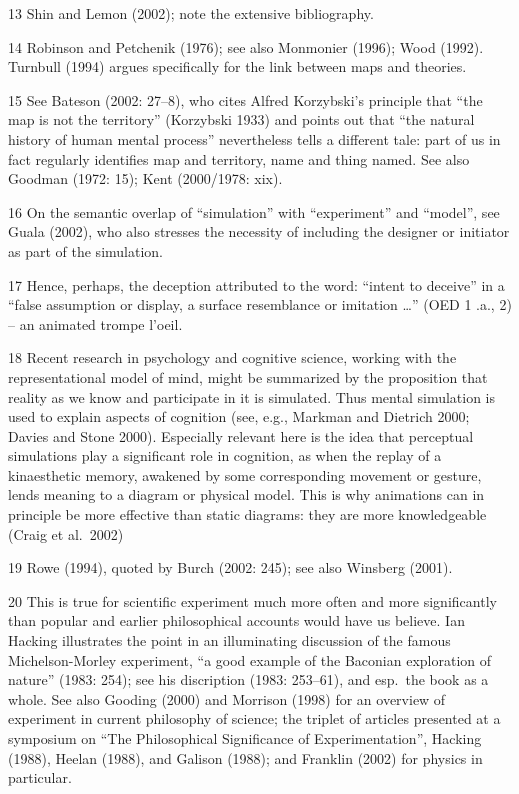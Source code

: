 13 Shin and Lemon (2002); note the extensive bibliography.

14 Robinson and Petchenik (1976); see also Monmonier (1996); Wood
(1992). Turnbull (1994) argues specifically for the link between maps
and theories.

15 See Bateson (2002: 27--8), who cites Alfred Korzybski's principle
that ``the map is not the territory'' (Korzybski 1933) and points out
that ``the natural history of human mental process'' nevertheless tells
a different tale: part of us in fact regularly identifies map and
territory, name and thing named. See also Goodman (1972: 15); Kent
(2000/1978: xix).

16 On the semantic overlap of ``simulation'' with ``experiment'' and
``model'', see Guala (2002), who also stresses the necessity of
including the designer or initiator as part of the simulation.

17 Hence, perhaps, the deception attributed to the word: ``intent to
deceive'' in a ``false assumption or display, a surface resemblance or
imitation \ldots{}'' (OED 1 .a., 2) -- an animated trompe l'oeil.

18 Recent research in psychology and cognitive science, working with the
representational model of mind, might be summarized by the proposition
that reality as we know and participate in it is simulated. Thus mental
simulation is used to explain aspects of cognition (see, e.g., Markman
and Dietrich 2000; Davies and Stone 2000). Especially relevant here is
the idea that perceptual simulations play a significant role in
cognition, as when the replay of a kinaesthetic memory, awakened by some
corresponding movement or gesture, lends meaning to a diagram or
physical model. This is why animations can in principle be more
effective than static diagrams: they are more knowledgeable (Craig et
al.~2002)

19 Rowe (1994), quoted by Burch (2002: 245); see also Winsberg (2001).

20 This is true for scientific experiment much more often and more
significantly than popular and earlier philosophical accounts would have
us believe. Ian Hacking illustrates the point in an illuminating
discussion of the famous Michelson-Morley experiment, ``a good example
of the Baconian exploration of nature'' (1983: 254); see his discription
(1983: 253--61), and esp.~the book as a whole. See also Gooding (2000)
and Morrison (1998) for an overview of experiment in current philosophy
of science; the triplet of articles presented at a symposium on ``The
Philosophical Significance of Experimentation'', Hacking (1988), Heelan
(1988), and Galison (1988); and Franklin (2002) for physics in
particular.

